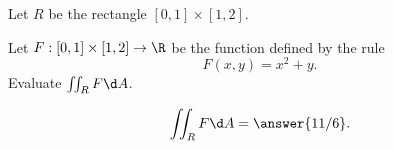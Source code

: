 \documentclass{ximera}
\author{Jim Fowler}
\begin{document}
\begin{exercise}
  Let $R$ be the rectangle $[0,1] \times [1,2]$.
  
  Let $F : [0,1] \times [1,2] \to \R$ be the function defined by the rule
  \[
    F(x,y) = x^2 + y.
  \]
  Evaluate $\iint_R F \d A$.
  
  \begin{prompt}
    \[
      \iint_R F \d A = \answer{11/6}.
    \]
  \end{prompt}

\end{exercise}
\end{document}

